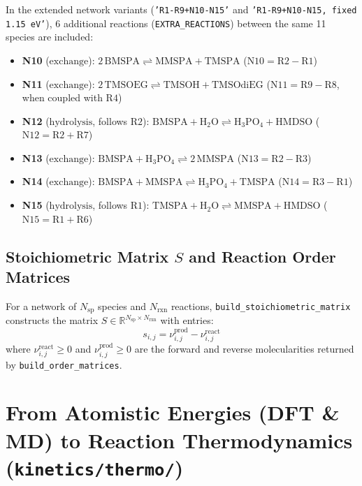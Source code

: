 \documentclass[11pt,a4paper]{article}
\let\origsection\section
\renewcommand{\section}{\clearpage\origsection}
\begin{document}
\medskip
In the extended network variants (\texttt{'R1-R9+N10-N15'} and \texttt{'R1-R9+N10-N15,\allowbreak{} fixed 1.15 eV'}), 6 additional reactions (\texttt{EXTRA\_\allowbreak{}REACTIONS}) between the same 11 species are included:
\begin{itemize}[leftmargin=1.8em]
    \item \textbf{N10} ($\text{exchange}$): $2\,\text{BMSPA} \rightleftharpoons \text{MMSPA} + \text{TMSPA}$ ($\text{N10} = \text{R2} - \text{R1}$)
    \item \textbf{N11} ($\text{exchange}$): $2\,\text{TMSOEG} \rightleftharpoons \text{TMSOH} + \text{TMSOdiEG}$ ($\text{N11} = \text{R9} - \text{R8}$, when coupled with $\text{R4}$)
    \item \textbf{N12} ($\text{hydrolysis}$, follows $\text{R2}$): $\text{BMSPA} + \text{H}_2\text{O} \rightleftharpoons \text{H}_3\text{PO}_4 + \text{HMDSO}$ ($\text{N12} = \text{R2} + \text{R7}$)
    \item \textbf{N13} ($\text{exchange}$): $\text{BMSPA} + \text{H}_3\text{PO}_4 \rightleftharpoons 2\,\text{MMSPA}$ ($\text{N13} = \text{R2} - \text{R3}$)
    \item \textbf{N14} ($\text{exchange}$): $\text{BMSPA} + \text{MMSPA} \rightleftharpoons \text{H}_3\text{PO}_4 + \text{TMSPA}$ ($\text{N14} = \text{R3} - \text{R1}$)
    \item \textbf{N15} ($\text{hydrolysis}$, follows $\text{R1}$): $\text{TMSPA} + \text{H}_2\text{O} \rightleftharpoons \text{MMSPA} + \text{HMDSO}$ ($\text{N15} = \text{R1} + \text{R6}$)
\end{itemize}

\subsection{Stoichiometric Matrix $S$ and Reaction Order Matrices}

For a network of $N_{\text{sp}}$ species and $N_{\text{rxn}}$ reactions, \texttt{build\_\allowbreak{}stoichiometric\_\allowbreak{}matrix} constructs the matrix $S \in \mathbb{R}^{N_{\text{sp}} \times N_{\text{rxn}}}$ with entries:
\begin{equation}
s_{i,j} = \nu_{i,j}^{\text{prod}} - \nu_{i,j}^{\text{react}}
\end{equation}
where $\nu_{i,j}^{\text{react}} \ge 0$ and $\nu_{i,j}^{\text{prod}} \ge 0$ are the forward and reverse molecularities returned by \texttt{build\_\allowbreak{}order\_\allowbreak{}matrices}.


\section{From Atomistic Energies (DFT \& MD) to Reaction Thermodynamics (\texttt{kinetics/\allowbreak{}thermo/\allowbreak{}})}
\end{document}
